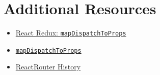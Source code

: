 \section{Additional Resources}

\begin{itemize}[leftmargin=*]
    \item \href{https://react-redux.js.org/using-react-redux/connect-mapdispatch}{React Redux: \texttt{mapDispatchToProps}}
    \item \href{https://learn.co/lessons/map-dispatch-to-props-readme}{\texttt{mapDispatchToProps}}
    \item \href{https://github.com/ReactTraining/history}{ReactRouter History}
\end{itemize}
